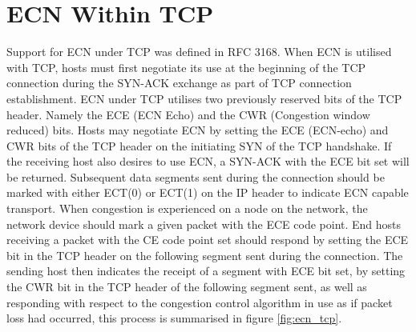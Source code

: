 \documentclass{l4proj}
\begin{document}
\section{ECN Within TCP}
\label{sec:ecntcp}

Support for ECN under TCP was defined in RFC 3168\cite{rfc3168}. When ECN is utilised with TCP, hosts must first negotiate its use at the beginning of the TCP connection during the SYN-ACK exchange as part of TCP connection establishment. ECN under TCP utilises two previously reserved bits of the TCP header. Namely the ECE (ECN Echo) and the CWR (Congestion window reduced) bits. Hosts may negotiate ECN by setting the ECE (ECN-echo) and CWR bits of the TCP header on the initiating SYN of the TCP handshake. If the receiving host also desires to use ECN, a SYN-ACK with the ECE bit set will be returned. Subsequent data segments sent during the connection should be marked with either ECT(0) or ECT(1) on the IP header to indicate ECN capable transport. When congestion is experienced on a node on the network, the network device should mark a given packet with the ECE code point. End hosts receiving a packet with the CE code point set should respond by setting the ECE bit in the TCP header on the following segment sent during the connection. The sending host then indicates the receipt of a segment with ECE bit set, by setting the CWR bit in the TCP header of the following segment sent, as well as responding with respect to the congestion control algorithm in use as if packet loss had occurred, this process is summarised in figure \ref{fig:ecn_tcp}.
\end{document}
